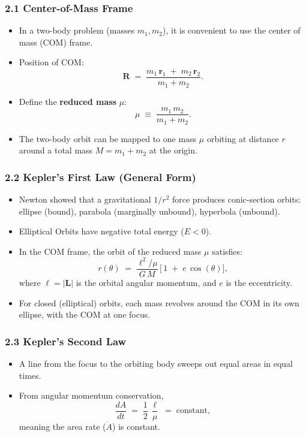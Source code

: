 \subsubsection{2.1 Center-of-Mass Frame}
\begin{itemize}
  \item In a two-body problem (masses $m_1, m_2$), it is convenient to use the center of mass (COM) frame.
  \item Position of COM:
  \[
    \mathbf{R}
    \;=\;
    \frac{m_1\,\mathbf{r}_1 \;+\; m_2\,\mathbf{r}_2}{m_1 + m_2}.
  \]
  \item Define the \textbf{reduced mass} $\mu$:
  \[
    \mu 
    \;\equiv\;
    \frac{m_1\,m_2}{m_1 + m_2}.
  \]
  \item The two-body orbit can be mapped to one mass $\mu$ orbiting at distance $r$ around a total mass $M = m_1 + m_2$ at the origin.
\end{itemize}

\subsubsection{2.2 Kepler’s First Law (General Form)}
\begin{itemize}
  \item Newton showed that a gravitational $1/r^2$ force produces conic-section orbits: ellipse (bound), parabola (marginally unbound), hyperbola (unbound).
  \item Elliptical Orbits have negative total energy ($E < 0$).
  \item In the COM frame, the orbit of the reduced mass $\mu$ satisfies:
  \[
    r(\theta)
    \;=\;
    \frac{\ell^2/\mu}{\,G\,M\,}\,\bigl[\,1 \;+\; e\,\cos(\theta)\bigr],
  \]
  where $\ell = |\mathbf{L}|$ is the orbital angular momentum, and $e$ is the eccentricity.
  \item For closed (elliptical) orbits, each mass revolves around the COM in its own ellipse, with the COM at one focus.
\end{itemize}

\subsubsection{2.3 Kepler’s Second Law}
\begin{itemize}
  \item A line from the focus to the orbiting body sweeps out equal areas in equal times.
  \item From angular momentum conservation,
  \[
    \frac{dA}{dt}
    \;=\;
    \frac{1}{2}\,\frac{\ell}{\mu}
    \;=\;\text{constant},
  \]
  meaning the area rate ($\dot{A}$) is constant.
\end{itemize}

